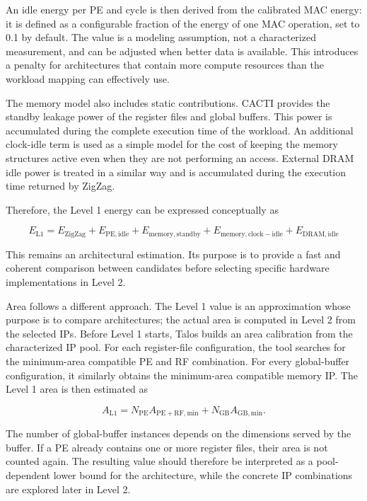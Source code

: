 An idle energy per PE and cycle is then derived from the calibrated
MAC energy: it is defined as a configurable fraction of the energy of
one MAC operation, set to 0.1 by default. The value is a modeling
assumption, not a characterized measurement, and can be adjusted when
better data is available. This introduces a penalty for architectures
that contain more compute resources than the workload mapping can
effectively use.

The memory model also includes static contributions. CACTI provides
the standby leakage power of the register files and global buffers.
This power is accumulated during the complete execution time of the
workload. An additional clock-idle term is used as a simple model for
the cost of keeping the memory structures active even when they are
not performing an access. External DRAM idle power is treated in a
similar way and is accumulated during the execution time returned by
ZigZag.

Therefore, the Level 1 energy can be expressed conceptually as

\[
E_{\mathrm{L1}} =
E_{\mathrm{ZigZag}} +
E_{\mathrm{PE,idle}} +
E_{\mathrm{memory,standby}} +
E_{\mathrm{memory,clock-idle}} +
E_{\mathrm{DRAM,idle}}
\]

This remains an architectural estimation. Its purpose is to provide a
fast and coherent comparison between candidates before selecting
specific hardware implementations in Level 2.

Area follows a different approach. The Level 1 value is an
approximation whose purpose is to compare architectures; the actual
area is computed in Level 2 from the selected IPs. Before Level 1
starts, Talos builds an area calibration from the characterized IP
pool. For each
register-file configuration, the tool searches for the minimum-area
compatible PE and RF combination. For every global-buffer
configuration, it similarly obtains the minimum-area compatible
memory IP. The Level 1 area is then estimated as

\[
A_{\mathrm{L1}} =
N_{\mathrm{PE}} A_{\mathrm{PE+RF,min}} +
N_{\mathrm{GB}} A_{\mathrm{GB,min}}.
\]

The number of global-buffer instances depends on the dimensions served
by the buffer. If a PE already contains one or more register files,
their area is not counted again. The resulting value should therefore
be interpreted as a pool-dependent lower bound for the architecture,
while the concrete IP combinations are explored later in Level 2.


